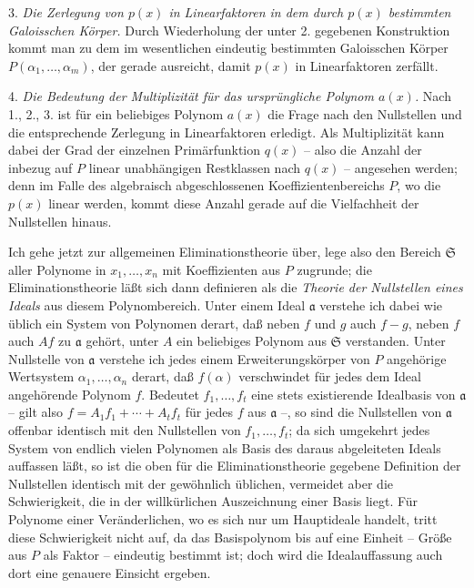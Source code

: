 3. \emph{Die Zerlegung von $p(x)$ in Linearfaktoren in dem durch $p(x)$ bestimmten Galoisschen Körper.} Durch Wiederholung der unter 2. gegebenen Konstruktion kommt man zu dem im wesentlichen eindeutig bestimmten Galoisschen Körper $P(\alpha_1,\ldots,\alpha_m)$, der gerade ausreicht, damit $p(x)$ in Linearfaktoren zerfällt.

4. \emph{Die Bedeutung der Multiplizität für das ursprüngliche Polynom $a(x)$.} Nach 1., 2., 3. ist für ein beliebiges Polynom $a(x)$ die Frage nach den Nullstellen und die entsprechende Zerlegung in Linearfaktoren erledigt. Als Multiplizität kann dabei der Grad der einzelnen Primärfunktion $q(x)$ -- also die Anzahl der inbezug auf $P$ linear unabhängigen Restklassen nach $q(x)$ -- angesehen werden; denn im Falle des algebraisch abgeschlossenen Koeffizientenbereichs $P$, wo die $p(x)$ linear werden, kommt diese Anzahl gerade auf die Vielfachheit der Nullstellen hinaus.

Ich gehe jetzt zur allgemeinen Eliminationstheorie über, lege also den Bereich $\mathfrak S$ aller Polynome in $x_1,\ldots,x_n$ mit Koeffizienten aus $P$ zugrunde; die Eliminationstheorie läßt sich dann definieren als die \emph{Theorie der Nullstellen eines Ideals} aus diesem Polynombereich. Unter einem Ideal $\mathfrak a$ verstehe ich dabei wie üblich ein System von Polynomen derart, daß neben $f$ und $g$ auch $f-g$, neben $f$ auch $Af$ zu $\mathfrak a$ gehört, unter $A$ ein beliebiges Polynom aus $\mathfrak S$ verstanden. Unter Nullstelle von $\mathfrak a$ verstehe ich jedes einem Erweiterungskörper von $P$ angehörige Wertsystem $\alpha_1,\ldots,\alpha_n$ derart, daß $f(\alpha)$ verschwindet für jedes dem Ideal angehörende Polynom $f$. Bedeutet $f_1,\ldots,f_t$ eine stets existierende Idealbasis von $\mathfrak a$ -- gilt also $f=A_1f_1+\cdots+A_tf_t$ für jedes $f$ aus $\mathfrak a$ --, so sind die Nullstellen von $\mathfrak a$ offenbar identisch mit den Nullstellen von $f_1,\ldots,f_t$; da sich umgekehrt jedes System von endlich vielen Polynomen als Basis des daraus abgeleiteten Ideals auffassen läßt, so ist die oben für die Eliminationstheorie gegebene Definition der Nullstellen identisch mit der gewöhnlich üblichen, vermeidet aber die Schwierigkeit, die in der willkürlichen Auszeichnung einer Basis liegt. Für Polynome einer Veränderlichen, wo es sich nur um Hauptideale handelt, tritt diese Schwierigkeit nicht auf, da das Basispolynom bis auf eine Einheit -- Größe aus $P$ als Faktor -- eindeutig bestimmt ist; doch wird die Idealauffassung auch dort eine genauere Einsicht ergeben.


